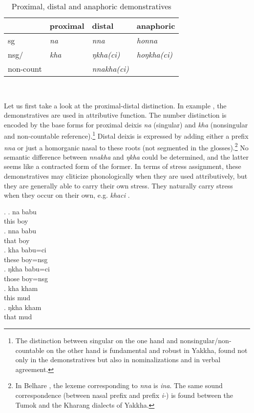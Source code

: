 \begin{table}[htp]
\begin{centering}
\begin{tabular}{llll}
\toprule
&			{\sc proximal} 	& {\sc distal}	& {\sc anaphoric}  \\
\midrule
{\sc sg}						&	\emph{na}		&	\emph{nna}		& \emph{honna}\\
{\sc nsg/}	&		\emph{kha}	&	\emph{ŋkha(ci)}	\ti	& \emph{hoŋkha(ci)}\\
{\sc non-count}	&			&	\emph{nnakha(ci)}	& \\
\bottomrule
\end{tabular}\\
\caption{Proximal, distal and anaphoric demonstratives}\label{dem-tab}
\end{centering}
\end{table}


Let us first take a look at the proximal-distal distinction.  In example \Next, the demonstratives are used in attributive function. The number distinction is encoded by the base forms for proximal deixis \emph{na} (singular) and \emph{kha} (nonsingular and non-countable reference).\footnote{The distinction between singular on the one hand and nonsingular/non-countable on the other hand is fundamental and robust in Yakkha, found not only in the  demonstratives but also in nominalizations and in verbal agreement.}  Distal deixis is expressed by adding either a prefix \emph{nna} or just a homorganic nasal to these roots (not segmented in the glosses).\footnote{In Belhare \citep[548]{Bickel2003Belhare}, the lexeme corresponding to \emph{nna} is \emph{ina}. The same sound correspondence (between nasal prefix and prefix \emph{i-}) is found between the Tumok and  the Kharang dialects of Yakkha.} No semantic difference between \emph{nnakha} and \emph{ŋkha} could be determined, and the latter seems like a contracted form of the former. In terms of stress assignment, these demonstratives may cliticize phonologically when they are used attributively, but they are generally able to carry their own stress. They naturally  carry stress when they occur on their own, e.g. \emph{khaci} .

\ex. \ag. na babu \\
	this boy\\
	\bg. nna babu \\
		that boy\\
	\bg. kha babu=ci\\
		these boy{\sc =nsg}\\
	\bg. ŋkha babu=ci\\
		those boy{\sc =nsg}\\
		\bg. kha kham\\
		this mud\\
	\bg. ŋkha kham\\
		that mud\\


